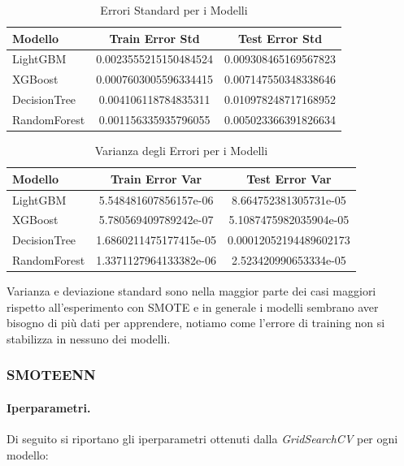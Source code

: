 \begin{table}[H]
    \centering
    \begin{tabular}{lcc}
    \toprule
    \textbf{Modello} & \textbf{Train Error Std} & \textbf{Test Error Std} \\
    \midrule
    LightGBM & 0.0023555215150484524 & 0.009308465169567823 \\
    XGBoost & 0.0007603005596334415 & 0.007147550348338646 \\
    DecisionTree & 0.004106118784835311 & 0.010978248717168952 \\
    RandomForest & 0.001156335935796055 & 0.005023366391826634 \\
    \bottomrule
    \end{tabular}
    \caption{Errori Standard per i Modelli}
    
\end{table}

\begin{table}[H]
    \centering
    \begin{tabular}{lcc}
    \toprule
    \textbf{Modello} & \textbf{Train Error Var} & \textbf{Test Error Var} \\
    \midrule
    LightGBM & 5.548481607856157e-06 & 8.664752381305731e-05 \\
    XGBoost & 5.780569409789242e-07 & 5.1087475982035904e-05 \\
    DecisionTree & 1.6860211475177415e-05 & 0.00012052194489602173 \\
    RandomForest & 1.3371127964133382e-06 & 2.523420990653334e-05 \\
    \bottomrule
    \end{tabular}
    \caption{Varianza degli Errori per i Modelli}
    
\end{table}

\noindent Varianza e deviazione standard sono nella maggior parte dei casi maggiori rispetto all'esperimento con SMOTE e in generale i modelli sembrano aver bisogno di più dati per apprendere, notiamo come l'errore di training non si stabilizza in nessuno dei modelli.

\subsubsection{SMOTEENN}
\paragraph{Iperparametri.} Di seguito si riportano gli iperparametri ottenuti dalla \textit{GridSearchCV} per ogni modello:

